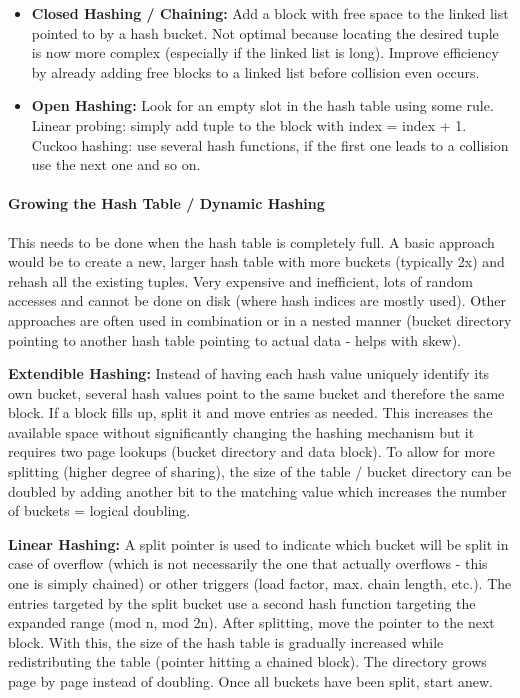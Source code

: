 \begin{itemize}
    \item \textbf{Closed Hashing / Chaining:} Add a block with free space to the linked list pointed to by a hash bucket. Not optimal because locating the desired tuple is now more complex (especially if the linked list is long). Improve efficiency by already adding free blocks to a linked list before collision even occurs.
    \item \textbf{Open Hashing:} Look for an empty slot in the hash table using some rule. Linear probing: simply add tuple to the block with index = index + 1. Cuckoo hashing: use several hash functions, if the first one leads to a collision use the next one and so on.
\end{itemize}

\paragraph{Growing the Hash Table / Dynamic Hashing}
This needs to be done when the hash table is completely full. A basic approach would be to create a new, larger hash table with more buckets (typically 2x) and rehash all the existing tuples. Very expensive and inefficient, lots of random accesses and cannot be done on disk (where hash indices are mostly used). Other approaches are often used in combination or in a nested manner (bucket directory pointing to another hash table pointing to actual data - helps with skew).

\textbf{Extendible Hashing:} Instead of having each hash value uniquely identify its own bucket, several hash values point to the same bucket and therefore the same block. If a block fills up, split it and move entries as needed. This increases the available space without significantly changing the hashing mechanism but it requires two page lookups (bucket directory and data block). To allow for more splitting (higher degree of sharing), the size of the table / bucket directory can be doubled by adding another bit to the matching value which increases the number of buckets = logical doubling. %

\textbf{Linear Hashing:} A split pointer is used to indicate which bucket will be split in case of overflow (which is not necessarily the one that actually overflows - this one is simply chained) or other triggers (load factor, max. chain length, etc.). The entries targeted by the split bucket use a second hash function targeting the expanded range (mod n, mod 2n). After splitting, move the pointer to the next block. With this, the size of the hash table is gradually increased while redistributing the table (pointer hitting a chained block). The directory grows page by page instead of doubling. Once all buckets have been split, start anew. %


